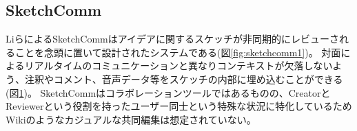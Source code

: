 \subsection{SketchComm}

\begin{figure}[H] \begin{minipage}{0.5\hsize}
                      \begin{center} 
                      \end{center} \caption{} \label{fig:sketchcomm1}
\end{minipage} \begin{minipage}{0.5\hsize}
                   \begin{center} 
                   \end{center} \caption{} \label{fig:sketchcomm2}
\end{minipage}
\end{figure}
LiらによるSketchComm\cite{Li2012SketchCommAT}はアイデアに関するスケッチが非同期的にレビューされることを念頭に置いて設計されたシステムである(図\ref{fig:sketchcomm1})。
対面によるリアルタイムのコミュニケーションと異なりコンテキストが欠落しないよう、注釈やコメント、音声データ等をスケッチの内部に埋め込むことができる(図\ref{fig:sketchcomm2})。
SketchCommはコラボレーションツールではあるものの、CreatorとReviewerという役割を持ったユーザー同士という特殊な状況に特化しているため
Wikiのようなカジュアルな共同編集は想定されていない。